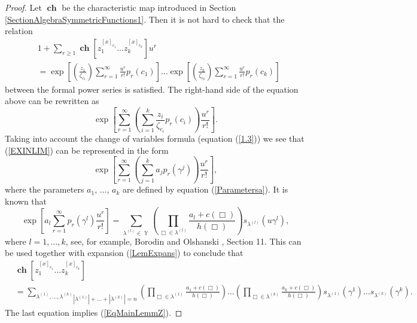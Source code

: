 \documentclass[12pt]{amsart}
\theoremstyle{definition}
\numberwithin{equation}{section}
\DeclareMathOperator{\Y}{\mathbb{Y}}
\DeclareMathOperator{\ch}{\textbf{ch}}
\begin{document}
\begin{proof}
Let $\ch$ be the characteristic map introduced in Section \ref{SectionAlgebraSymmetricFunctions1}.
Then it is not hard  to check that the relation
\begin{equation}\label{LemExpans}
\begin{split}
&1+\sum\limits_{r\geq 1}\ch\left[z_1^{[x]_{c_1}}\ldots z_k^{[x]_{c_k}}\right]u^r\\
&=\exp\left[\left(\frac{z_1}{\zeta_{c_1}}\right)\sum\limits_{r=1}^{\infty}\frac{u^r}{r!}p_r(c_1)\right]\ldots
\exp\left[\left(\frac{z_k}{\zeta_{c_k}}\right)\sum\limits_{r=1}^{\infty}\frac{u^r}{r!}p_r(c_k)\right]
\end{split}
\end{equation}
between the formal power series is satisfied.  The right-hand side of the equation  above can be rewritten as
\begin{equation}\label{EXINLIM}
\exp\left[\sum\limits_{r=1}^{\infty}\left(\sum\limits_{i=1}^k\frac{z_i}{\zeta_{c_i}}p_r(c_i)\right)
\frac{u^r}{r!}\right].
\end{equation}
Taking into account the change of variables formula (equation (\ref{1.3})) we see that (\ref{EXINLIM}) can be represented in the form
\begin{equation}\label{EXINLIM1}
\exp\left[\sum\limits_{r=1}^{\infty}\left(\sum\limits_{j=1}^ka_jp_r(\gamma^j)\right)
\frac{u^r}{r!}\right],
\end{equation}
where  the parameters $a_1$, $\ldots$, $a_k$ are defined by  equation (\ref{Parametersa}).
It is known that
\begin{equation}
\exp\left[a_l\sum\limits_{r=1}^{\infty}p_r(\gamma^{l})\frac{u^r}{r!}\right]
=\sum\limits_{\lambda^{(l)}\in\Y}\left(\prod\limits_{\Box\in\lambda^{(l)}}\frac{a_l+c(\Box)}{h(\Box)}\right)s_{\lambda^{(l)}}(u\gamma^{l}),
\end{equation}
where $l=1,\ldots, k$, see, for example, Borodin and Olshanski
\cite{BorodinOlshanskiBook}, Section 11. This can be used together with  expansion (\ref{LemExpans}) to conclude that
\begin{equation}
\begin{split}
&\ch\left[z_1^{[x]_{c_1}}\ldots z_k^{[x]_{c_k}}\right]\\
&=
\underset{|\lambda^{(1)}|+\ldots+|\lambda^{(k)}|=n}{\sum\limits_{\lambda^{(1)},\ldots,\lambda^{(k)}}}
\left(\prod\limits_{\Box\in\lambda^{(1)}}\frac{a_1+c(\Box)}{h(\Box)}\right)
\ldots\left(\prod\limits_{\Box\in\lambda^{(k)}}\frac{a_k+c(\Box)}{h(\Box)}\right)
s_{\lambda^{(1)}}\left(\gamma^{1}\right)\ldots s_{\lambda^{(k)}}\left(\gamma^{k}\right).
\end{split}
\end{equation}
The last equation implies (\ref{EqMainLemmZ}).
\end{proof}
\end{document}

